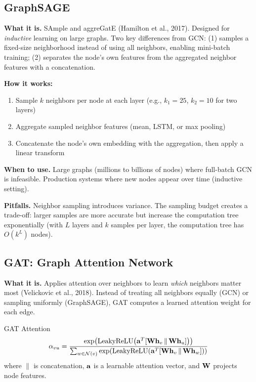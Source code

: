 \subsection{GraphSAGE}

\textbf{What it is.} SAmple and aggreGatE (Hamilton et al., 2017). Designed for \textit{inductive} learning on large graphs. Two key differences from GCN: (1) samples a fixed-size neighborhood instead of using all neighbors, enabling mini-batch training; (2) separates the node's own features from the aggregated neighbor features with a concatenation.

\textbf{How it works:}
\begin{enumerate}
    \item Sample $k$ neighbors per node at each layer (e.g., $k_1 = 25$, $k_2 = 10$ for two layers)
    \item Aggregate sampled neighbor features (mean, LSTM, or max pooling)
    \item Concatenate the node's own embedding with the aggregation, then apply a linear transform
\end{enumerate}

\textbf{When to use.} Large graphs (millions to billions of nodes) where full-batch GCN is infeasible. Production systems where new nodes appear over time (inductive setting).

\textbf{Pitfalls.} Neighbor sampling introduces variance. The sampling budget creates a trade-off: larger samples are more accurate but increase the computation tree exponentially (with $L$ layers and $k$ samples per layer, the computation tree has $O(k^L)$ nodes).

\subsection{GAT: Graph Attention Network}

\textbf{What it is.} Applies attention over neighbors to learn \textit{which} neighbors matter most (Velickovic et al., 2018). Instead of treating all neighbors equally (GCN) or sampling uniformly (GraphSAGE), GAT computes a learned attention weight for each edge.

\begin{mathresult}{GAT Attention}
\begin{equation}
\alpha_{vu} = \frac{\exp\!\left(\text{LeakyReLU}\!\left(\mathbf{a}^T [\mathbf{W}\mathbf{h}_v \,\|\, \mathbf{W}\mathbf{h}_u]\right)\right)}{\sum_{w \in \mathcal{N}(v)} \exp\!\left(\text{LeakyReLU}\!\left(\mathbf{a}^T [\mathbf{W}\mathbf{h}_v \,\|\, \mathbf{W}\mathbf{h}_w]\right)\right)}
\label{eq:gat}
\end{equation}
where $\|$ is concatenation, $\mathbf{a}$ is a learnable attention vector, and $\mathbf{W}$ projects node features.
\end{mathresult}

